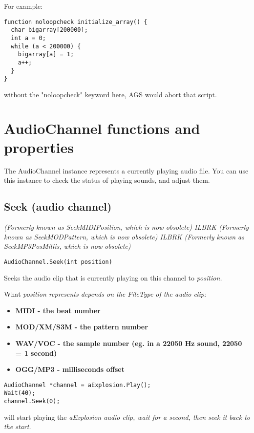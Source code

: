 For example:
\begin{verbatim}
function noloopcheck initialize_array() {
  char bigarray[200000];
  int a = 0;
  while (a < 200000) {
    bigarray[a] = 1;
    a++;
  }
}
\end{verbatim}
without the "noloopcheck" keyword here, AGS would abort that script.


\section{AudioChannel functions and properties}\label{AudioChannelCommands}%

The AudioChannel instance represents a currently playing audio file. You can use this
instance to check the status of playing sounds, and adjust them.


\subsection{Seek (audio channel)}\label{AudioChannel.Seek}%

\it{(Formerly known as SeekMIDIPosition, which is now obsolete)} ILBRK
\it{(Formerly known as SeekMODPattern, which is now obsolete)} ILBRK
\it{(Formerly known as SeekMP3PosMillis, which is now obsolete)}

\begin{verbatim}
AudioChannel.Seek(int position)
\end{verbatim}
Seeks the audio clip that is currently playing on this channel to \it{position}.

What \it{position} represents depends on the FileType of the audio clip:
\begin{itemize}
\item \bf{MIDI} - the beat number
\item \bf{MOD/XM/S3M} - the pattern number
\item \bf{WAV/VOC} - the sample number (eg. in a 22050 Hz sound, 22050 = 1 second)
\item \bf{OGG/MP3} - milliseconds offset
\end{itemize}

\begin{verbatim}
AudioChannel *channel = aExplosion.Play();
Wait(40);
channel.Seek(0);
\end{verbatim}
will start playing the \it{aExplosion} audio clip, wait for a second, then seek it back to the start.


